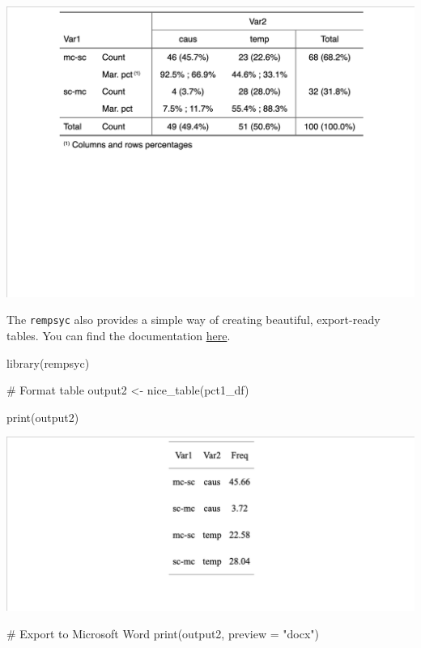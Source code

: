 \documentclass[
  11pt,
  letterpaper,
  DIV=11,
  numbers=noendperiod]{scrreprt}
\newenvironment{Shaded}{\begin{snugshade}}{\end{snugshade}}
\newcommand{\AttributeTok}[1]{\textcolor[rgb]{0.40,0.45,0.13}{#1}}
\newcommand{\CommentTok}[1]{\textcolor[rgb]{0.37,0.37,0.37}{#1}}
\newcommand{\FunctionTok}[1]{\textcolor[rgb]{0.28,0.35,0.67}{#1}}
\newcommand{\NormalTok}[1]{\textcolor[rgb]{0.00,0.23,0.31}{#1}}
\newcommand{\OtherTok}[1]{\textcolor[rgb]{0.00,0.23,0.31}{#1}}
\newcommand{\StringTok}[1]{\textcolor[rgb]{0.13,0.47,0.30}{#1}}
\begin{document}
\includegraphics{crosstable_plot1.png}

The \texttt{rempsyc} also provides a simple way of creating beautiful,
export-ready tables. You can find the documentation
\href{https://rempsyc.remi-theriault.com/articles/table}{here}.

\begin{Shaded}
\begin{Highlighting}[]
\FunctionTok{library}\NormalTok{(rempsyc)}

\CommentTok{\# Format table}
\NormalTok{output2 }\OtherTok{\textless{}{-}} \FunctionTok{nice\_table}\NormalTok{(pct1\_df)}

\FunctionTok{print}\NormalTok{(output2)}
\end{Highlighting}
\end{Shaded}

\includegraphics{crosstable_plot2.png}

\begin{Shaded}
\begin{Highlighting}[]
\CommentTok{\# Export to Microsoft Word}
\FunctionTok{print}\NormalTok{(output2, }\AttributeTok{preview =} \StringTok{"docx"}\NormalTok{)}
\end{Highlighting}
\end{Shaded}
\end{document}

